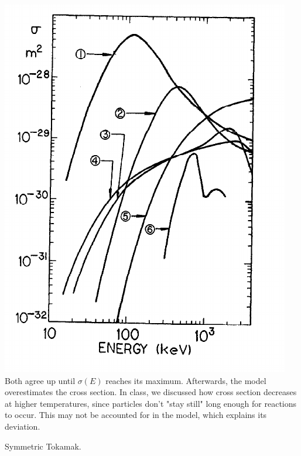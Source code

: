 \documentclass[answers]{exam}
\begin{document}
\begin{questions}
\begin{parts}
\begin{solution}
    \includegraphics[width=\textwidth]{2c1.png}
    Both agree up until $\sigma(E)$ reaches its maximum. Afterwards, the model overestimates the cross section. In class, we discussed how cross section decreases at higher temperatures, since particles don't "stay still" long enough for reactions to occur. This may not be accounted for in the model, which explains its deviation.
\end{solution}

\end{parts}


\begin{solution}
    Symmetric Tokamak.
\end{solution}

\end{questions}
\end{document}
